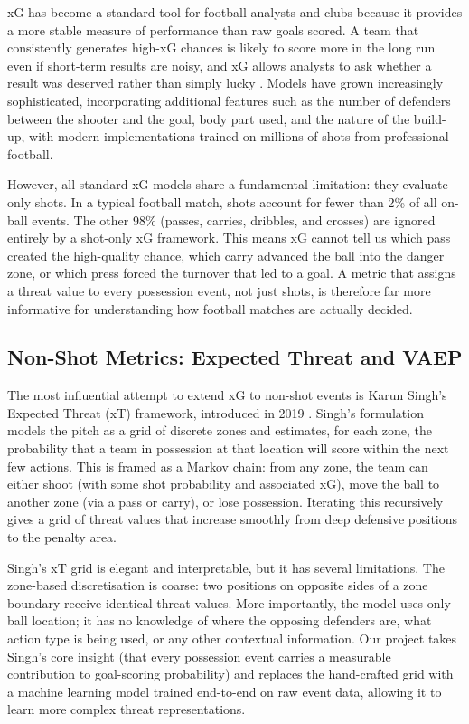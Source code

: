 \documentclass{article}
\begin{document}
xG has become a standard tool for football analysts and clubs because it provides a more stable measure of performance than raw goals scored. A team that consistently generates high-xG chances is likely to score more in the long run even if short-term results are noisy, and xG allows analysts to ask whether a result was deserved rather than simply lucky \cite{statsbomb2018}. Models have grown increasingly sophisticated, incorporating additional features such as the number of defenders between the shooter and the goal, body part used, and the nature of the build-up, with modern implementations trained on millions of shots from professional football.

However, all standard xG models share a fundamental limitation: they evaluate only shots. In a typical football match, shots account for fewer than 2\% of all on-ball events. The other 98\% (passes, carries, dribbles, and crosses) are ignored entirely by a shot-only xG framework. This means xG cannot tell us which pass created the high-quality chance, which carry advanced the ball into the danger zone, or which press forced the turnover that led to a goal. A metric that assigns a threat value to every possession event, not just shots, is therefore far more informative for understanding how football matches are actually decided.

\subsection{Non-Shot Metrics: Expected Threat and VAEP}

The most influential attempt to extend xG to non-shot events is Karun Singh's Expected Threat (xT) framework, introduced in 2019 \cite{singh2019}. Singh's formulation models the pitch as a grid of discrete zones and estimates, for each zone, the probability that a team in possession at that location will score within the next few actions. This is framed as a Markov chain: from any zone, the team can either shoot (with some shot probability and associated xG), move the ball to another zone (via a pass or carry), or lose possession. Iterating this recursively gives a grid of threat values that increase smoothly from deep defensive positions to the penalty area.

Singh's xT grid is elegant and interpretable, but it has several limitations. The zone-based discretisation is coarse: two positions on opposite sides of a zone boundary receive identical threat values. More importantly, the model uses only ball location; it has no knowledge of where the opposing defenders are, what action type is being used, or any other contextual information. Our project takes Singh's core insight (that every possession event carries a measurable contribution to goal-scoring probability) and replaces the hand-crafted grid with a machine learning model trained end-to-end on raw event data, allowing it to learn more complex threat representations.
\end{document}
